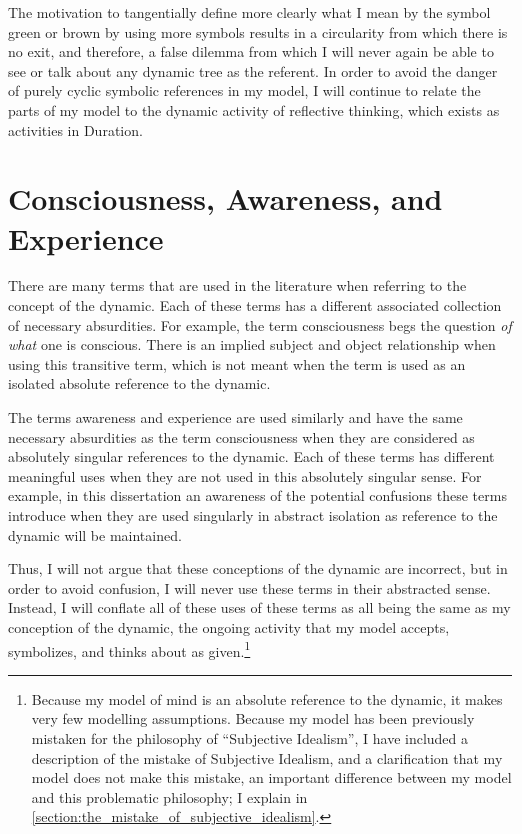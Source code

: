 The motivation to tangentially define more clearly what I mean by the
symbol green or brown by using more symbols results in a circularity
from which there is no exit, and therefore, a false dilemma from which
I will never again be able to see or talk about any dynamic tree as
the referent.  In order to avoid the danger of purely cyclic symbolic
references in my model, I will continue to relate the parts of my
model to the dynamic activity of reflective thinking, which exists as
activities in Duration.

\section{Consciousness, Awareness, and Experience}

There are many terms that are used in the literature when referring to
the concept of the dynamic.  Each of these terms has a different
associated collection of necessary absurdities.  For example, the term
consciousness begs the question \emph{of what} one is conscious.
There is an implied subject and object relationship when using this
transitive term, which is not meant when the term is used as an
isolated absolute reference to the dynamic.

The terms awareness and experience are used similarly and have the
same necessary absurdities as the term consciousness when they are
considered as absolutely singular references to the dynamic.  Each of
these terms has different meaningful uses when they are not used in
this absolutely singular sense.  For example, in this dissertation an
awareness of the potential confusions these terms introduce when they
are used singularly in abstract isolation as reference to the dynamic
will be maintained.

Thus, I will not argue that these conceptions of the dynamic are
incorrect, but in order to avoid confusion, I will never use these
terms in their abstracted sense.  Instead, I will conflate all of
these uses of these terms as all being the same as my conception of
the dynamic, the ongoing activity that my model accepts, symbolizes,
and thinks about as given.\footnote{Because my model of mind is an
  absolute reference to the dynamic, it makes very few modelling
  assumptions.  Because my model has been previously mistaken for the
  philosophy of ``Subjective Idealism'', I have included a description
  of the mistake of Subjective Idealism, and a clarification that my
  model does not make this mistake, an important difference between my
  model and this problematic philosophy; I explain in
  \autoref{section:the_mistake_of_subjective_idealism}.}

